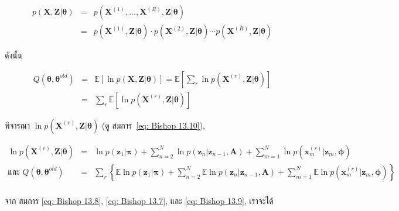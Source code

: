 \begin{eqnarray}
p(\textbf{X}, \textbf{Z}|\bm{\theta})
&=& p(\textbf{X}^{(1)}, \ldots, \textbf{X}^{(R)}, \textbf{Z}|\bm{\theta})
\nonumber \\
&=& p(\textbf{X}^{(1)}, \textbf{Z}|\bm{\theta}) \cdot p(\textbf{X}^{(2)}, \textbf{Z}|\bm{\theta}) \cdots
p(\textbf{X}^{(R)}, \textbf{Z}|\bm{\theta})
\label{eq: HMM Multiple Seq p(X,Z)}
\end{eqnarray}

ดังนั้น 

\begin{eqnarray}
Q(\bm{\theta}, \bm{\theta}^{old}) 
&=& \mathbb{E} [\ln p(\textbf{X}, \textbf{Z}|\bm{\theta})]
= \mathbb{E} \left[\sum_r \ln p(\textbf{X}^{(r)}, \textbf{Z}|\bm{\theta}) \right]
\nonumber \\
&=& \sum_r \mathbb{E} \left[ \ln p(\textbf{X}^{(r)}, \textbf{Z}|\bm{\theta}) \right]
\label{eq: HMM Multiple Seq Q}
\end{eqnarray}

พิจารณา $\ln p(\textbf{X}^{(r)}, \textbf{Z}|\bm{\theta})$ (ดู สมการ~\ref{eq: Bishop 13.10}),

\begin{eqnarray}
\ln p(\textbf{X}^{(r)}, \textbf{Z}|\bm{\theta})
&=& \ln p(\textbf{z}_1|\bm{\pi}) 
+ \sum_{n=2}^N \ln p(\textbf{z}_n | \textbf{z}_{n-1}, \textbf{A})
+ \sum_{m=1}^N \ln p(\textbf{x}_m^{(r)}|\textbf{z}_m, \bm{\phi})
\nonumber \\
\mbox{และ }
Q(\bm{\theta}, \bm{\theta}^{old})
&=&
\sum_r \left\{ \mathbb{E} \ln p(\textbf{z}_1|\bm{\pi})
+ \sum_{n=2}^N \mathbb{E} \ln p(\textbf{z}_n | \textbf{z}_{n-1}, \textbf{A})
+ \sum_{m=1}^N \mathbb{E} \ln p(\textbf{x}_m^{(r)}|\textbf{z}_m, \bm{\phi}) \right\}
\nonumber \\
\label{eq: HMM Multiple P(X,Z) cf Bishop 13.10}
\end{eqnarray}

จาก สมการ \ref{eq: Bishop 13.8}, \ref{eq: Bishop 13.7}, และ \ref{eq: Bishop 13.9}, 
เราจะได้


